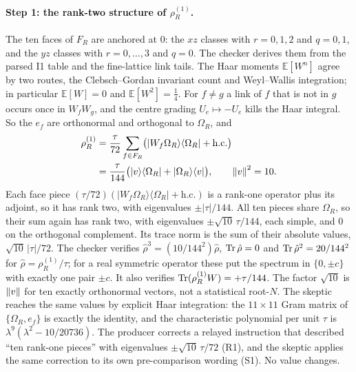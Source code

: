 \paragraph{Step 1: the rank-two structure of \texorpdfstring{$\rho^{(1)}_R$}{rho1}.}
The ten faces of $F_R$ are anchored at $0$: the $xz$ classes with $r=0,1,2$
and $q=0,1$, and the $yz$ classes with $r=0,\dots,3$ and $q=0$. The checker
derives them from the parsed I1 table and the fine-lattice link tails. The
Haar moments $\mathbb E[W^n]$ agree by two routes, the Clebsch--Gordan
invariant count and Weyl--Wallis integration; in particular $\mathbb E[W]=0$
and $\mathbb E[W^2]=\tfrac14$. For $f\ne g$ a link of $f$ that is not in $g$
occurs once in $W_fW_g$, and the centre grading $U_e\mapsto-U_e$ kills the
Haar integral. So the $e_f$ are orthonormal and orthogonal to $\Omega_R$, and
\begin{equation}
 \begin{aligned}
 \rho^{(1)}_R&=\frac\tau{72}\sum_{f\in F_R}\bigl(|W_f\Omega_R\rangle\langle\Omega_R|+\text{h.c.}\bigr)\\
 &=\frac\tau{144}\bigl(|v\rangle\langle\Omega_R|+|\Omega_R\rangle\langle v|\bigr),
 \qquad\left\lVert v\right\rVert^2=10 .
 \end{aligned}
 \label{eq:ay2-rank}
\end{equation}
Each face piece $(\tau/72)(|W_f\Omega_R\rangle\langle\Omega_R|+\text{h.c.})$
is a rank-one operator plus its adjoint, so it has rank two, with eigenvalues
$\pm|\tau|/144$. All ten pieces share $\Omega_R$, so their sum again has rank
two, with eigenvalues $\pm\sqrt{10}\,\tau/144$, each simple, and $0$ on the
orthogonal complement. Its trace norm is the sum of their absolute values,
$\sqrt{10}\,|\tau|/72$. The checker verifies $\hat\rho^3=(10/144^2)\hat\rho$,
$\operatorname{Tr}\hat\rho=0$ and $\operatorname{Tr}\hat\rho^2=20/144^2$ for $\hat\rho=\rho^{(1)}_R/\tau$;
for a real symmetric operator these put the spectrum in $\{0,\pm c\}$ with
exactly one pair $\pm c$. It also verifies $\operatorname{Tr}(\rho^{(1)}_RW)=+\tau/144$.
The factor $\sqrt{10}$ is $\left\lVert v\right\rVert$ for ten exactly orthonormal vectors, not a
statistical root-$N$. The skeptic reaches the same values by explicit Haar
integration: the $11\times11$ Gram matrix of $\{\Omega_R,e_f\}$ is exactly the
identity, and the characteristic polynomial per unit $\tau$ is
$\lambda^9(\lambda^2-10/20736)$. The producer corrects a relayed instruction
that described ``ten rank-one pieces'' with eigenvalues
$\pm\sqrt{10}\,\tau/72$ (R1), and the skeptic applies the same correction to
its own pre-comparison wording (S1). No value changes.

